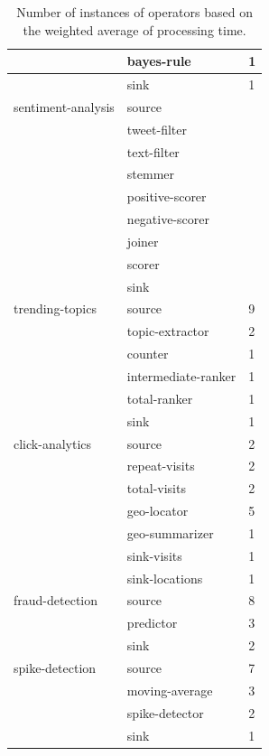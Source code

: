 \documentclass[ppgc,diss,english]{iiufrgs}
\begin{document}
\begin{table}[t]
\begin{center}
\begin{tabular}{ | l | l | l | }
	 & bayes-rule & 1 \\ \hline
	 & sink & 1 \\ \hline
	sentiment-analysis & source &  \\ \hline
	 & tweet-filter &  \\ \hline
	 & text-filter &  \\ \hline
	 & stemmer &  \\ \hline
	 & positive-scorer &  \\ \hline
	 & negative-scorer &  \\ \hline
	 & joiner &  \\ \hline
	 & scorer &  \\ \hline
	 & sink &  \\ \hline
	trending-topics & source & 9 \\ \hline
	 & topic-extractor & 2 \\ \hline
	 & counter & 1 \\ \hline
	 & intermediate-ranker & 1 \\ \hline
	 & total-ranker & 1 \\ \hline
	 & sink & 1 \\ \hline
	click-analytics & source & 2 \\ \hline
	 & repeat-visits & 2 \\ \hline
	 & total-visits & 2 \\ \hline
	 & geo-locator & 5 \\ \hline
	 & geo-summarizer & 1 \\ \hline
	 & sink-visits & 1 \\ \hline
	 & sink-locations & 1 \\ \hline
	fraud-detection & source & 8 \\ \hline
	 & predictor & 3 \\ \hline
	 & sink & 2 \\ \hline
	spike-detection & source & 7 \\ \hline
	 & moving-average & 3 \\ \hline
	 & spike-detector & 2 \\ \hline
	 & sink & 1 \\ \hline
\end{tabular}
	\caption[Number of instances of operators]{Number of instances of operators based on the weighted average of processing time.}
	\label{table:app_parallelism}
\end{center}
\end{table}

\end{document}
